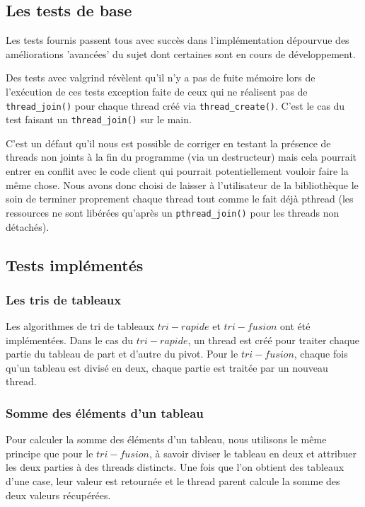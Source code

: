 \subsection{Les tests de base}

Les tests fournis passent tous avec succès dans l'implémentation dépourvue des améliorations 'avancées' du sujet dont certaines sont en cours de développement.

Des tests avec valgrind révèlent qu'il n'y a pas de fuite mémoire lors de l'exécution de ces tests exception faite de ceux qui ne réalisent pas de \verb!thread_join()! pour chaque thread créé via \verb!thread_create()!. C'est le cas du test faisant un \verb!thread_join()! sur le main.

C'est un défaut qu'il nous est possible de corriger en testant la présence de threads non joints à la fin du programme (via un destructeur) mais cela pourrait entrer en conflit avec le code client qui pourrait potentiellement vouloir faire la même chose. Nous avons donc choisi de laisser à l'utilisateur de la bibliothèque le soin de terminer proprement chaque thread tout comme le fait déjà pthread (les ressources ne sont libérées qu'après un \verb!pthread_join()! pour les threads non détachés).


\subsection{Tests implémentés}

\subsubsection{Les tris de tableaux}
Les algorithmes de tri de tableaux $tri-rapide$ et $tri-fusion$ ont été implémentées. Dans le cas du $tri-rapide$, un thread est créé pour traiter chaque partie du tableau de part et d'autre du pivot. Pour le $tri-fusion$, chaque fois qu'un tableau est divisé en deux, chaque partie est traitée par un nouveau thread.\\



\subsubsection{Somme des éléments d'un tableau}
Pour calculer la somme des éléments d'un tableau, nous utilisons le même principe que pour le $tri-fusion$, à savoir diviser le tableau en deux et attribuer les deux parties à des threads distincts. Une fois que l'on obtient des tableaux d'une case, leur valeur est retournée et le thread parent calcule la somme des deux valeurs récupérées.

